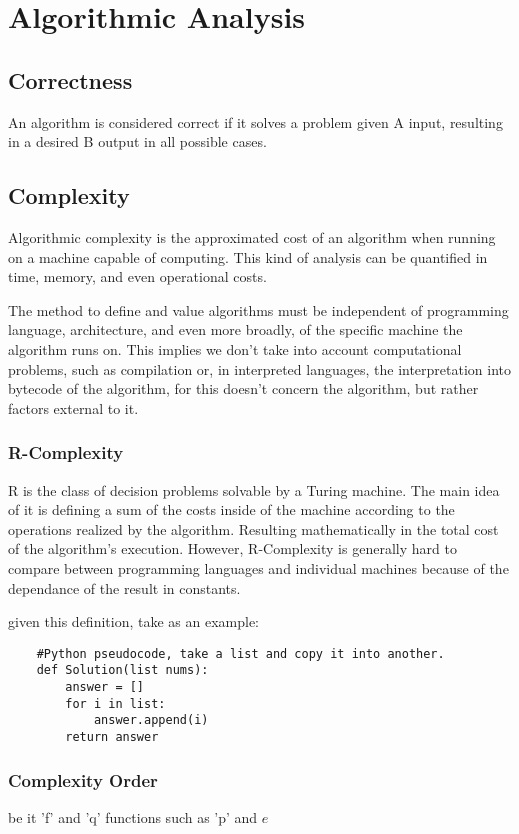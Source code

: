 \documentclass[12pt,a4paper,olive]{bbe}
\begin{document}
			
	\chapter{Algorithmic Analysis}
	\section{Correctness}
	An algorithm is considered correct if it solves a problem given A input, resulting in a desired B output in all possible cases.

	\section{Complexity}
	Algorithmic complexity is the approximated cost of an algorithm when running on a machine capable of computing. This kind of analysis can be quantified in time, memory, and even operational costs.

	\begin{remark}
	The method to define and value algorithms must be independent of programming language, architecture, and even more broadly, of the specific machine the algorithm runs on. This implies we don't take into account computational problems, such as compilation or, in interpreted languages, the interpretation into bytecode of the algorithm, for this doesn't concern the algorithm, but rather factors external to it.   
	\end{remark}

	\subsection{R-Complexity}
	R is the class of decision problems solvable by a Turing machine. The main idea of it is defining a sum of the costs inside of the machine according to the operations realized by the algorithm. Resulting mathematically in the total cost of the algorithm's execution. However, R-Complexity is generally hard to compare between programming languages and individual machines because of the dependance of the result in constants.

	given this definition, take as an example:

	\begin{verbatim}
	#Python pseudocode, take a list and copy it into another.
	def Solution(list nums):
		answer = []
		for i in list:
			answer.append(i)
		return answer
	\end{verbatim}

	\subsection{Complexity Order}
	be it 'f' and 'q' functions such as 'p' and $e$
 
\end{document}
